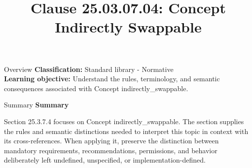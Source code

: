 \documentclass[10pt,letterpaper]{article}
\title{Clause 25.03.07.04: Concept Indirectly Swappable}
\author{}
\date{}
\begin{document}
\maketitle
\begin{CornellOverviewBox}{Overview}
\textbf{Classification:} Standard library - Normative\\[2pt]
\textbf{Learning objective:} Understand the rules, terminology, and semantic consequences associated with Concept indirectly\_swappable.
\end{CornellOverviewBox}\begin{CornellSummaryBox}{Summary}
{\sffamily\bfseries\color{Accent} Summary}\par\vspace{3pt}Section 25.3.7.4 focuses on Concept indirectly\_swappable. The section supplies the rules and semantic distinctions needed to interpret this topic in context with its cross-references. When applying it, preserve the distinction between mandatory requirements, recommendations, permissions, and behavior deliberately left undefined, unspecified, or implementation-defined.
\end{CornellSummaryBox}
\end{document}
